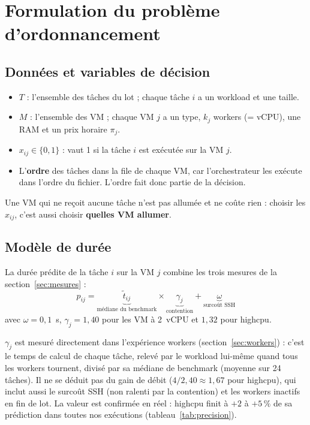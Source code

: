 \section{Formulation du problème d'ordonnancement}
\label{sec:formulation}

\subsection{Données et variables de décision}

\begin{itemize}
  \item $T$ : l'ensemble des tâches du lot ; chaque tâche $i$ a un workload et une taille.
  \item $M$ : l'ensemble des VM ; chaque VM $j$ a un type, $k_j$ workers (= vCPU),
        une RAM et un prix horaire $\pi_j$.
  \item $x_{ij} \in \{0,1\}$ : vaut 1 si la tâche $i$ est exécutée sur la VM $j$.
  \item L'\textbf{ordre} des tâches dans la file de chaque VM, car l'orchestrateur
        les exécute dans l'ordre du fichier. L'ordre fait donc partie de la décision.
\end{itemize}

Une VM qui ne reçoit aucune tâche n'est pas allumée et ne coûte rien : choisir
les $x_{ij}$, c'est aussi choisir \textbf{quelles VM allumer}.

\subsection{Modèle de durée}

La durée prédite de la tâche $i$ sur la VM $j$ combine les trois mesures de la
section~\ref{sec:mesures} :
\begin{equation}
  p_{ij} = \underbrace{\tilde{t}_{ij}}_{\text{médiane du benchmark}}
  \times \underbrace{\gamma_j}_{\text{contention}}
  + \underbrace{\omega}_{\text{surcoût SSH}}
  \label{eq:pij}
\end{equation}
avec $\omega = 0{,}1$~s, $\gamma_j = 1{,}40$ pour les VM à 2~vCPU et $1{,}32$ pour
highcpu.

$\gamma_j$ est mesuré directement dans l'expérience workers
(section~\ref{sec:workers}) : c'est le temps de calcul de chaque tâche, relevé par
le workload lui-même quand tous les workers tournent, divisé par sa médiane de
benchmark (moyenne sur 24 tâches). Il ne se déduit pas du gain de débit
($4/2{,}40 \approx 1{,}67$ pour highcpu), qui inclut aussi le surcoût SSH (non
ralenti par la contention) et les workers inactifs en fin de lot. La valeur est
confirmée en réel : highcpu finit à $+2$ à $+5\,\%$ de sa prédiction dans toutes
nos exécutions (tableau~\ref{tab:precision}).

